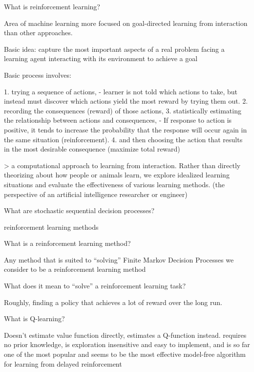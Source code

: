 \documentclass[10pt]{article}
\begin{document}
 

\hrulefill
What is reinforcement learning?

Area of machine learning more focused on goal-directed learning from interaction than other approaches.

Basic idea: capture the most important aspects of a real problem facing a learning agent interacting with its environment to achieve a goal

Basic process involves: 

1. trying a sequence of actions, 
    - learner is not told which actions to take, but instead must discover which actions yield the most reward by trying them out.
2. recording the consequences (reward) of those actions,
3. statistically estimating the relationship between actions and consequences,
    - If response to action is positive, it tends to increase the probability that the response will occur again in the same situation (reinforcement).
4. and then choosing the action that results in the most desirable consequence (maximize total reward)

> a computational approach to learning from interaction. Rather than directly theorizing about how people or animals learn, we explore idealized learning situations and evaluate the effectiveness of various learning methods. (the perspective of an artificial intelligence researcher or engineer)


\hrulefill

What are stochastic sequential decision processes?

reinforcement learning methods

\hrulefill

What is a reinforcement learning method?

Any method that is suited to ``solving'' Finite Markov Decision Processes we consider to be a reinforcement learning method

\hrulefill

What does it mean to ``solve'' a reinforcement learning task?

Roughly, finding a policy that achieves a lot of reward over the long run.

\hrulefill

What is Q-learning?

Doesn't estimate value function directly, estimates a Q-function instead.
requires no prior knowledge, is exploration insensitive and easy to implement, and is so far one of the most popular and seems to be the most effective model-free algorithm for learning from delayed reinforcement
\end{document}
